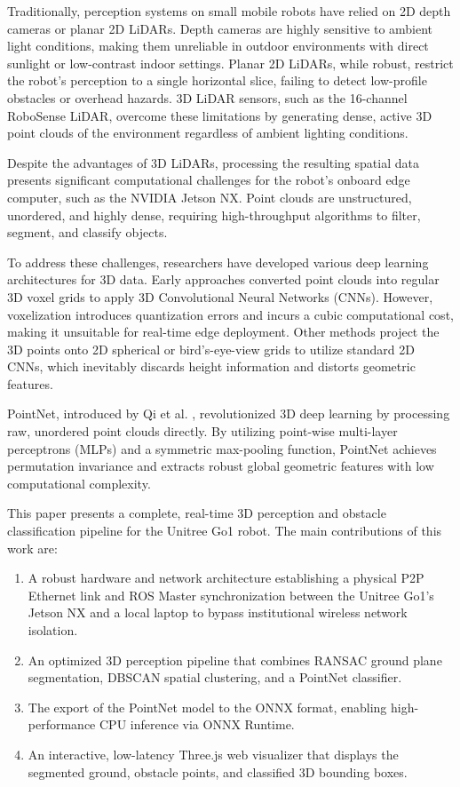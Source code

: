 \documentclass[a4paper,twocolumn]{article}
\begin{document}
Traditionally, perception systems on small mobile robots have relied on 2D depth cameras or planar 2D LiDARs. Depth cameras are highly sensitive to ambient light conditions, making them unreliable in outdoor environments with direct sunlight or low-contrast indoor settings. Planar 2D LiDARs, while robust, restrict the robot's perception to a single horizontal slice, failing to detect low-profile obstacles or overhead hazards. 3D LiDAR sensors, such as the 16-channel RoboSense LiDAR, overcome these limitations by generating dense, active 3D point clouds of the environment regardless of ambient lighting conditions.

Despite the advantages of 3D LiDARs, processing the resulting spatial data presents significant computational challenges for the robot's onboard edge computer, such as the NVIDIA Jetson NX. Point clouds are unstructured, unordered, and highly dense, requiring high-throughput algorithms to filter, segment, and classify objects. 

To address these challenges, researchers have developed various deep learning architectures for 3D data. Early approaches converted point clouds into regular 3D voxel grids to apply 3D Convolutional Neural Networks (CNNs). However, voxelization introduces quantization errors and incurs a cubic computational cost, making it unsuitable for real-time edge deployment. Other methods project the 3D points onto 2D spherical or bird's-eye-view grids to utilize standard 2D CNNs, which inevitably discards height information and distorts geometric features.

PointNet, introduced by Qi et al. \cite{Qi2017}, revolutionized 3D deep learning by processing raw, unordered point clouds directly. By utilizing point-wise multi-layer perceptrons (MLPs) and a symmetric max-pooling function, PointNet achieves permutation invariance and extracts robust global geometric features with low computational complexity.

This paper presents a complete, real-time 3D perception and obstacle classification pipeline for the Unitree Go1 robot. The main contributions of this work are:
\begin{enumerate}
    \item A robust hardware and network architecture establishing a physical P2P Ethernet link and ROS Master synchronization between the Unitree Go1's Jetson NX and a local laptop to bypass institutional wireless network isolation.
    \item An optimized 3D perception pipeline that combines RANSAC ground plane segmentation, DBSCAN spatial clustering, and a PointNet classifier.
    \item The export of the PointNet model to the ONNX format, enabling high-performance CPU inference via ONNX Runtime.
    \item An interactive, low-latency Three.js web visualizer that displays the segmented ground, obstacle points, and classified 3D bounding boxes.
\end{enumerate}
\end{document}
